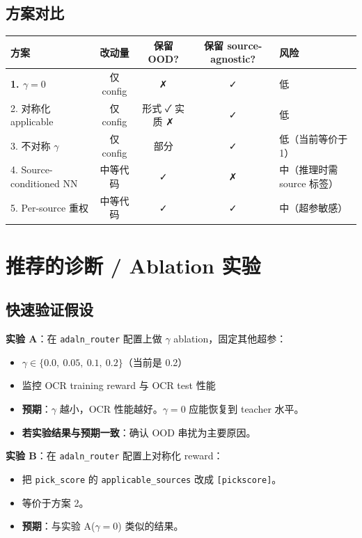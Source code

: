 \documentclass[11pt,a4paper]{article}
\begin{document}
\subsection{方案对比}

\begin{center}
\small
\begin{tabular}{l|c|c|c|p{4.5cm}}
\toprule
\textbf{方案} & \textbf{改动量} & \textbf{保留 OOD?} & \textbf{保留 source-agnostic?} & \textbf{风险} \\
\midrule
\textbf{1. $\gamma=0$} & 仅 config & ✗ & ✓ & 低 \\
2. 对称化 applicable & 仅 config & 形式 ✓ 实质 ✗ & ✓ & 低 \\
3. 不对称 $\gamma$ & 仅 config & 部分 & ✓ & 低（当前等价于 1） \\
4. Source-conditioned NN & 中等代码 & ✓ & ✗ & 中（推理时需 source 标签） \\
5. Per-source 重权 & 中等代码 & ✓ & ✓ & 中（超参敏感） \\
\bottomrule
\end{tabular}
\end{center}

\section{推荐的诊断 / Ablation 实验}

\subsection{快速验证假设}

\textbf{实验 A}：在 \texttt{adaln\_router} 配置上做 $\gamma$ ablation，固定其他超参：
\begin{itemize}
    \item $\gamma \in \{0.0,\ 0.05,\ 0.1,\ 0.2\}$（当前是 0.2）
    \item 监控 OCR training reward 与 OCR test 性能
    \item \textbf{预期}：$\gamma$ 越小，OCR 性能越好。$\gamma=0$ 应能恢复到 teacher 水平。
    \item \textbf{若实验结果与预期一致}：确认 OOD 串扰为主要原因。
\end{itemize}

\textbf{实验 B}：在 \texttt{adaln\_router} 配置上对称化 reward：
\begin{itemize}
    \item 把 \texttt{pick\_score} 的 \texttt{applicable\_sources} 改成 \texttt{[pickscore]}。
    \item 等价于方案 2。
    \item \textbf{预期}：与实验 A($\gamma{=}0$) 类似的结果。
\end{itemize}
\end{document}
